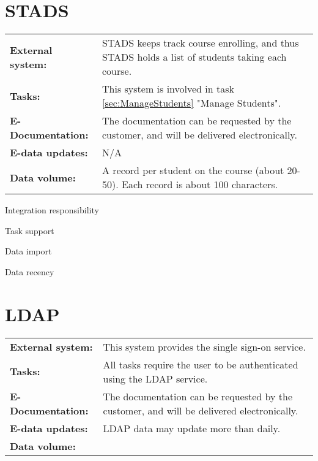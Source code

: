 \documentclass[Main]{subfiles}
\begin{document}
\section{STADS}\label{sec:STADS}
\begin{tabular}{l  p{13cm}}
 \textbf{External system:} & STADS keeps track course enrolling, and thus STADS holds a list of students taking each course. \\
 \textbf{Tasks:} &  This system is involved in task \ref{sec:ManageStudents} "Manage Students".\\
 \textbf{E-Documentation:} & The documentation can be requested by the customer, and will be delivered electronically.\\
 \textbf{E-data updates:} & N/A \\
 \textbf{Data volume:} & A record per student on the course (about 20-50). Each record is about 100 characters. \\
\end{tabular}

\begin{DynTable}{Integration responsibility}
\end{DynTable}

\begin{DynTable}{Task support}
\end{DynTable}

\begin{DynTable}{Data import}
\end{DynTable}

\begin{DynTable}{Data recency}
\end{DynTable}

\section{LDAP}\label{sec:LDAP}
\begin{tabular}{l  p{13cm}}
 \textbf{External system:} & This system provides the single sign-on service.\\
 \textbf{Tasks:} & All tasks require the user to be authenticated using the LDAP service.\\
 \textbf{E-Documentation:} & The documentation can be requested by the customer, and will be delivered electronically. \\
 \textbf{E-data updates:} & LDAP data may update more than daily. \\
 \textbf{Data volume:} & \\
\end{tabular}
\end{document}
